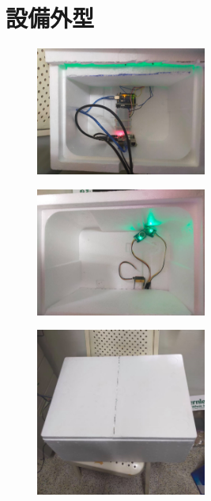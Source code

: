 \section{設備外型}
\begin{figure}[H]
	\centering
	\includegraphics[width=0.5\textwidth]{pic/box(1).jpg}
\end{figure}
\begin{figure}[H]
	\centering
	\includegraphics[width=0.5\textwidth]{pic/box(2).jpg}
\end{figure}
\begin{figure}[H]
	\centering
	\includegraphics[width=0.5\textwidth]{pic/box(3).jpg}
\end{figure}